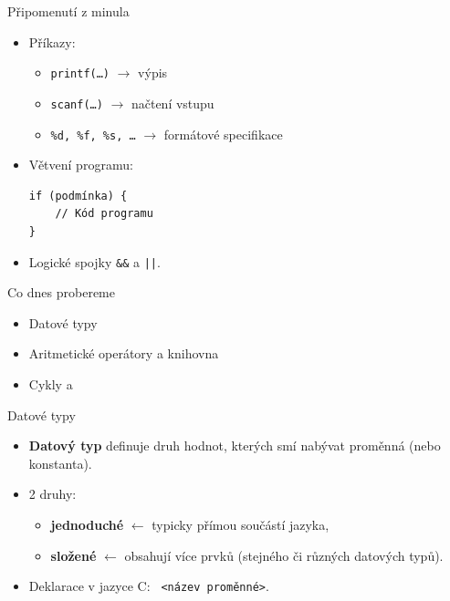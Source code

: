 \documentclass[14pt,aspectratio=169]{beamer}
\begin{document}

    \begin{frame}
        \titlepage
    \end{frame}

    \begin{frame}[t,fragile]{Připomenutí z minula}
        \begin{itemize}
            \item Příkazy:
            \begin{itemize}
                \item \texttt{printf(\dots)} $\rightarrow$ výpis
                \item \texttt{scanf(\dots)} $\rightarrow$ načtení vstupu
                \item \texttt{\%d, \%f, \%s, \dots} $\rightarrow$ formátové specifikace
            \end{itemize}
            \item Větvení programu:
            \begin{lstlisting}
if (podmínka) {
    // Kód programu
}
            \end{lstlisting}
            \item Logické spojky \texttt{\&\&} a \texttt{||}.
        \end{itemize}
    \end{frame}

    \begin{frame}[t]{Co dnes probereme}
        \begin{itemize}
            \item Datové typy
            \item Aritmetické operátory a knihovna 
            \item Cykly  a 
        \end{itemize}
    \end{frame}

    \begin{frame}[t]{Datové typy}
        \begin{itemize}
            \item \textbf{Datový typ} definuje druh hodnot, kterých smí nabývat proměnná (nebo konstanta).
            \item 2 druhy:
            \begin{itemize}
                \item \textbf{jednoduché} $\leftarrow$ typicky přímou součástí jazyka,
                \item \textbf{složené} $\leftarrow$ obsahují více prvků (stejného či různých datových typů).
            \end{itemize}
            \item Deklarace v jazyce C: \texttt{ <název proměnné>}.
        \end{itemize}
    \end{frame}
\end{document}
